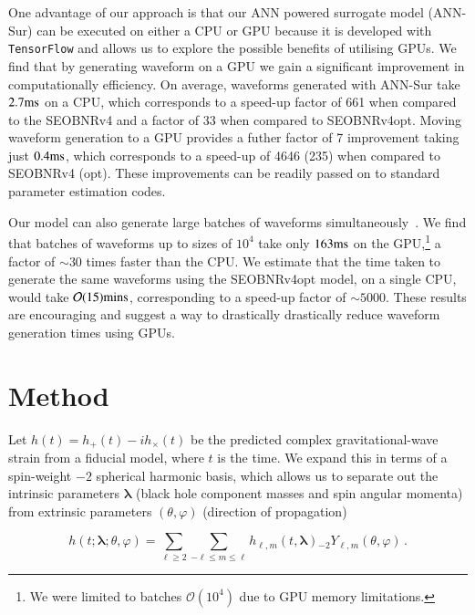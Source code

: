 \documentclass[aps,prd,reprint,superscriptaddress,preprintnumbers,showpacs,nofootinbib]{revtex4-1}
\begin{document}
One advantage of our approach is that our ANN powered surrogate model (ANN-Sur)
can be executed on either a CPU or GPU because it is developed with {\tt
TensorFlow} and allows us to explore the possible benefits of utilising GPUs. We
find that by generating waveform on a GPU we gain a significant improvement in
computationally efficiency. On average, waveforms generated with ANN-Sur take
$2.7 {\rm{ms}}$ on a CPU, which corresponds to a speed-up factor of 661 when
compared to the SEOBNRv4 and a factor of 33 when compared to SEOBNRv4opt. Moving
waveform generation to a GPU provides a futher factor of 7 improvement taking
just $0.4 {\rm{ms}}$, which corresponds to a speed-up of 4646 (235) when
compared to SEOBNRv4 (opt). These improvements can be readily passed on to
standard parameter estimation codes.

Our model can also generate large batches of waveforms
simultaneously~\cite{Chua2020LearningBP}. We find that batches of waveforms up
to sizes of $10^4$ take only $163 {\rm{ms}}$ on the GPU,\footnote{We were
limited to batches $\mathcal{O}(10^4)$ due to GPU memory limitations.} a factor
of $\sim 30$ times faster than the CPU. We estimate that the time taken to
generate the same waveforms using the SEOBNRv4opt model, on a single CPU, would
take $\mathcal{O}(15) {\rm{mins}}$, corresponding to a speed-up factor of $\sim
5000$. These results are encouraging and suggest a way to drastically
drastically reduce waveform generation times using GPUs.

\section{Method}
\label{sec:method}

Let $h(t) = h_{+}(t) - i h_{\times}(t)$ be the predicted complex
gravitational-wave strain from a fiducial model, where $t$ is the time. We
expand this in terms of a spin-weight $-2$ spherical harmonic basis, which
allows us to separate out the intrinsic parameters $\boldsymbol{\lambda}$ (black
hole component masses and spin angular momenta) from extrinsic parameters
$(\theta,\varphi)$ (direction of propagation)

\begin{equation}
h(t;\boldsymbol{\lambda};\theta,\varphi) = \sum_{\ell \geqslant 2} \sum_{-\ell\leqslant m \leqslant \ell} h_{\ell,m}(t,\boldsymbol{\lambda}) {}_{-2}Y_{\ell,m}(\theta,\varphi) \, .
\end{equation}
\end{document}

